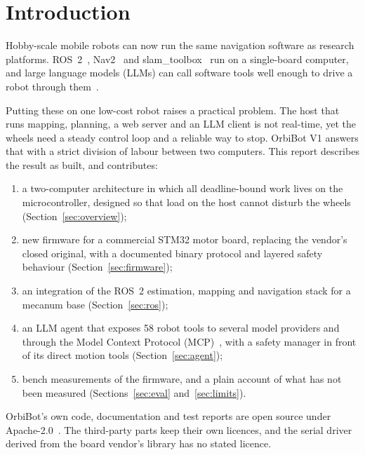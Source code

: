 \documentclass[11pt]{article}
\begin{document}
\section{Introduction}

Hobby-scale mobile robots can now run the same navigation software as research platforms. ROS~2~\cite{macenski2022ros2}, Nav2~\cite{macenski2020nav2} and slam\_toolbox~\cite{macenski2021slam} run on a single-board computer, and large language models (LLMs) can call software tools well enough to drive a robot through them~\cite{vemprala2024chatgpt}.

Putting these on one low-cost robot raises a practical problem. The host that runs mapping, planning, a web server and an LLM client is not real-time, yet the wheels need a steady control loop and a reliable way to stop. OrbiBot V1 answers that with a strict division of labour between two computers. This report describes the result as built, and contributes:

\begin{enumerate}
  \item a two-computer architecture in which all deadline-bound work lives on the microcontroller, designed so that load on the host cannot disturb the wheels (Section~\ref{sec:overview});
  \item new firmware for a commercial STM32 motor board, replacing the vendor's closed original, with a documented binary protocol and layered safety behaviour (Section~\ref{sec:firmware});
  \item an integration of the ROS~2 estimation, mapping and navigation stack for a mecanum base (Section~\ref{sec:ros});
  \item an LLM agent that exposes 58 robot tools to several model providers and through the Model Context Protocol (MCP)~\cite{mcp2024}, with a safety manager in front of its direct motion tools (Section~\ref{sec:agent});
  \item bench measurements of the firmware, and a plain account of what has not been measured (Sections~\ref{sec:eval} and~\ref{sec:limits}).
\end{enumerate}

OrbiBot's own code, documentation and test reports are open source under Apache-2.0~\cite{orbibotrepo}. The third-party parts keep their own licences, and the serial driver derived from the board vendor's library has no stated licence.
\end{document}
